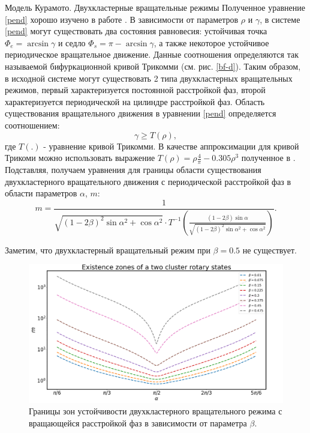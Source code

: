 \begin{chapter}{Модель Курамото. Двухкластерные вращательные режимы}
	Полученное уравнение \eqref{pend} хорошо изучено в работе \cite{Andronov:Vitt}.
	В зависимости от параметров $\rho$ и $\gamma$, в системе \eqref{pend}
	могут существовать два состояния равновесия:
	устойчивая точка $\Phi_e = \arcsin{\gamma}$ и седло
	$\Phi_s = \pi - \arcsin{\gamma}$, а также
	некоторое устойчивое периодическое вращательное движение.
	Данные соотношения определяются так называемой
	бифуркационной кривой Трикомми (см. рис. \ref{bf-d}).
	Таким образом, в исходной системе могут существовать 2 типа
	двухкластерных вращательных режимов, первый характеризуется
	постоянной расстройкой фаз, второй характеризуется
    периодической на цилиндре расстройкой фаз.
	Область существования вращательного движения в уравнении \eqref{pend}
	определяется соотношением:
	\begin{equation}
		\gamma \ge T(\rho),
	\end{equation}
	где $T(.)$ - уравнение кривой Трикомми. В качестве аппроксимации для кривой Трикоми можно использовать выражение
	$T(\rho) = \rho\frac{4}{\pi} - 0.305\rho^3$ полученное в \cite{Belykh:Brister}.
	Подставляя, получаем уравнения для границы области существования двухкластерного вращательного движения с
	периодической расстройкой фаз в области параметров $\alpha$, $m$:
	\begin{equation} \label{borders}
		m = \frac{1}{\sqrt{(1 - 2\beta)^2\sin{\alpha}^2 + \cos{\alpha}^2} \cdot T^{-1}(\frac{(1 - 2\beta)\sin{\alpha}}{\sqrt{(1 - 2\beta)^2\sin{\alpha}^2 + \cos{\alpha}^2}})}.
	\end{equation}

	Заметим, что двухкластерный вращательный режим при $\beta = 0.5$ не существует.

	\begin{figure}[h!]
		\begin{center}
			\includegraphics[width=1\columnwidth]{pictures/ex.png}
		\end{center}
		\caption{Границы зон устойчивости двухкластерного вращательного режима с вращающейся расстройкой фаз в зависимости от параметра $\beta$.}
		\label{ex-zones}
	\end{figure}


\end{chapter}
